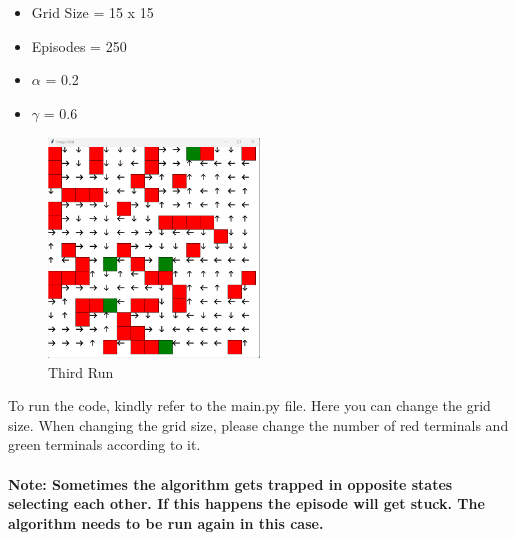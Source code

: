 \documentclass{article}
\begin{document}
\\~\\
\begin{itemize}
    \item Grid Size = 15 x 15
    \item Episodes = 250
    \item $\alpha$ = 0.2 
    \item $\gamma$ = 0.6
\end{itemize}

\begin{figure}[H]
  \centering
  \includegraphics[width=0.5\textwidth, height=0.3\textheight]{grid_3.png}
  \caption{Third Run}
\end{figure}


To run the code, kindly refer to the main.py file. Here you can change the grid size. When changing the grid size, please change the number of red terminals and green terminals according to it. 
\\~\\
\textbf{Note: Sometimes the algorithm gets trapped in opposite states selecting each other. If this happens the episode will get stuck. The algorithm needs to be run again in this case.}
\end{document}
